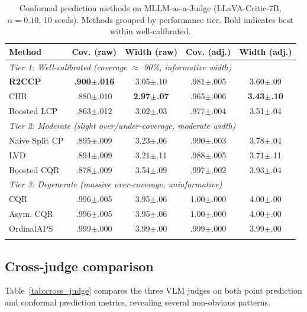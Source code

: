 \documentclass{article}
\begin{document}
\begin{table}[t]
\centering
\caption{Conformal prediction methods on MLLM-as-a-Judge (LLaVA-Critic-7B, $\alpha=0.10$, 10 seeds). Methods grouped by performance tier. Bold indicates best within well-calibrated.}
\label{tab:all_methods}
\small
\begin{tabular}{lcccc}
\toprule
\textbf{Method} & \textbf{Cov. (raw)} & \textbf{Width (raw)} & \textbf{Cov. (adj.)} & \textbf{Width (adj.)} \\
\midrule
\multicolumn{5}{l}{\emph{Tier 1: Well-calibrated (coverage $\approx$ 90\%, informative width)}} \\
\textbf{R2CCP} & \textbf{.900$\pm$.016} & 3.05$\pm$.10 & .981$\pm$.005 & 3.60$\pm$.09 \\
CHR & .880$\pm$.010 & \textbf{2.97$\pm$.07} & .965$\pm$.006 & \textbf{3.43$\pm$.10} \\
Boosted LCP & .863$\pm$.012 & 3.02$\pm$.03 & .977$\pm$.004 & 3.51$\pm$.04 \\
\midrule
\multicolumn{5}{l}{\emph{Tier 2: Moderate (slight over/under-coverage, moderate width)}} \\
Naive Split CP & .895$\pm$.009 & 3.23$\pm$.06 & .990$\pm$.003 & 3.78$\pm$.04 \\
LVD & .894$\pm$.009 & 3.21$\pm$.11 & .988$\pm$.005 & 3.71$\pm$.11 \\
Boosted CQR & .878$\pm$.009 & 3.54$\pm$.09 & .997$\pm$.002 & 3.93$\pm$.04 \\
\midrule
\multicolumn{5}{l}{\emph{Tier 3: Degenerate (massive over-coverage, uninformative)}} \\
CQR & .996$\pm$.005 & 3.95$\pm$.06 & 1.00$\pm$.000 & 4.00$\pm$.00 \\
Asym. CQR & .996$\pm$.005 & 3.95$\pm$.06 & 1.00$\pm$.000 & 4.00$\pm$.00 \\
OrdinalAPS & .999$\pm$.000 & 3.99$\pm$.00 & .999$\pm$.000 & 3.99$\pm$.00 \\
\bottomrule\vspace{-15pt}
\end{tabular}
\end{table}

\subsection{Cross-judge comparison}
\label{sec:cross_judge}

Table~\ref{tab:cross_judge} compares the three VLM judges on both point prediction and conformal prediction metrics, revealing several non-obvious patterns.
\end{document}
